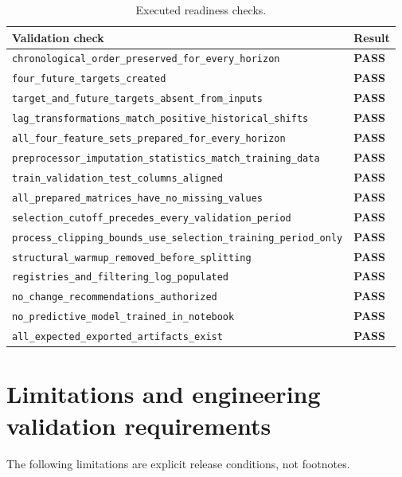\documentclass[10pt,a4paper]{article}
\begin{document}
\begin{table}[H]
\centering
\footnotesize
\begin{tabular}{p{}p{}}
\toprule
Validation check & Result \\
\midrule
\nolinkurl{chronological_order_preserved_for_every_horizon} & \textcolor{passgreen}{\textbf{PASS}} \\
\nolinkurl{four_future_targets_created} & \textcolor{passgreen}{\textbf{PASS}} \\
\nolinkurl{target_and_future_targets_absent_from_inputs} & \textcolor{passgreen}{\textbf{PASS}} \\
\nolinkurl{lag_transformations_match_positive_historical_shifts} & \textcolor{passgreen}{\textbf{PASS}} \\
\nolinkurl{all_four_feature_sets_prepared_for_every_horizon} & \textcolor{passgreen}{\textbf{PASS}} \\
\nolinkurl{preprocessor_imputation_statistics_match_training_data} & \textcolor{passgreen}{\textbf{PASS}} \\
\nolinkurl{train_validation_test_columns_aligned} & \textcolor{passgreen}{\textbf{PASS}} \\
\nolinkurl{all_prepared_matrices_have_no_missing_values} & \textcolor{passgreen}{\textbf{PASS}} \\
\nolinkurl{selection_cutoff_precedes_every_validation_period} & \textcolor{passgreen}{\textbf{PASS}} \\
\nolinkurl{process_clipping_bounds_use_selection_training_period_only} & \textcolor{passgreen}{\textbf{PASS}} \\
\nolinkurl{structural_warmup_removed_before_splitting} & \textcolor{passgreen}{\textbf{PASS}} \\
\nolinkurl{registries_and_filtering_log_populated} & \textcolor{passgreen}{\textbf{PASS}} \\
\nolinkurl{no_change_recommendations_authorized} & \textcolor{passgreen}{\textbf{PASS}} \\
\nolinkurl{no_predictive_model_trained_in_notebook} & \textcolor{passgreen}{\textbf{PASS}} \\
\nolinkurl{all_expected_exported_artifacts_exist} & \textcolor{passgreen}{\textbf{PASS}} \\
\bottomrule
\end{tabular}
\caption{Executed readiness checks.}
\end{table}


\section{Limitations and engineering validation requirements}
The following limitations are explicit release conditions, not footnotes.
\end{document}
